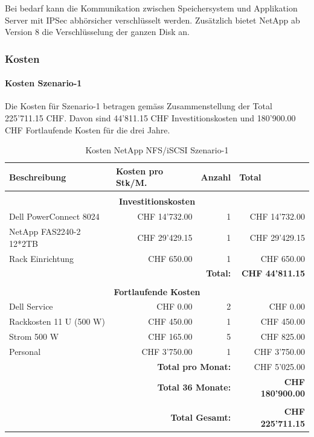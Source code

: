 Bei bedarf kann die Kommunikation zwischen Speichersystem und Applikation Server mit IPSec abhörsicher verschlüsselt werden. Zusätzlich bietet NetApp ab Version 8 die Verschlüsselung der ganzen Disk an.

\subsubsection{Kosten}

\paragraph*{Kosten Szenario-1}
Die Kosten für Szenario-1 betragen gemäss Zusammenstellung der Total 225'711.15 CHF. Davon sind 44'811.15 CHF Investitionskosten und 180'900.00 CHF Fortlaufende Kosten für die drei Jahre.

\begin{table}[htbp]
\caption{Kosten NetApp NFS/iSCSI Szenario-1}
\begin{small}
\begin{tabular}{|l|r|r|r|}
\hline
\textbf{Beschreibung} & \multicolumn{1}{l|}{\textbf{Kosten pro Stk/M.}} & \multicolumn{1}{l|}{\textbf{Anzahl}} & \multicolumn{1}{l|}{\textbf{Total}} \\ \hline
 \multicolumn{ 4}{c}{} \\ \hline
\multicolumn{ 4}{|c|}{\textbf{Investitionskosten}} \\ \hline
Dell PowerConnect 8024 & CHF 14'732.00 & 1 & CHF 14'732.00 \\ \hline
NetApp FAS2240-2 12*2TB & CHF 29'429.15 & 1 & CHF 29'429.15 \\ \hline
Rack Einrichtung & CHF 650.00 & 1 & CHF 650.00 \\ \hline \hline
 \multicolumn{ 3}{r|}{\textbf{Total:}} & \textbf{CHF 44'811.15} \\ 
 \cline{4-4}
\multicolumn{ 4}{c}{} \\ \hline
\multicolumn{ 4}{|c|}{\textbf{Fortlaufende Kosten}} \\ \hline
Dell Service & CHF 0.00 & 2 & CHF 0.00 \\ \hline
Rackkosten 11 U (500 W) & CHF 450.00 & 1 & CHF 450.00 \\ \hline
Strom 500 W & CHF 165.00 & 5 & CHF 825.00 \\ \hline
Personal & CHF 3'750.00 & 1 & CHF 3'750.00 \\ \hline \hline
 \multicolumn{ 3}{r|}{\textbf{Total pro Monat:}} & CHF 5'025.00 \\
\cline{4-4}
 \multicolumn{ 3}{r|}{\textbf{Total 36 Monate:}} & \textbf{CHF 180'900.00} \\ \cline{4-4}
 \multicolumn{ 4}{c}{} \\ \cline{4-4}
 \multicolumn{ 3}{r|}{\textbf{Total Gesamt:}} & \textbf{CHF 225'711.15} \\ \cline{4-4}
\end{tabular}
\end{small}
\label{KostenNetAppS1}
\end{table}


